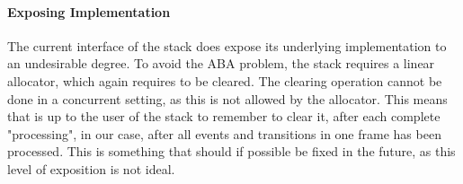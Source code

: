 \paragraph{Exposing Implementation}
The current interface of the stack does expose its underlying implementation to an
undesirable degree.
To avoid the ABA problem, the stack requires a linear allocator, which again requires
to be cleared.
The clearing operation cannot be done in a concurrent setting, as this is not allowed by the allocator.
This means that is up to the user of the stack to remember to clear it,
after each complete "processing", in our case, after all events and transitions in one frame
has been processed.
This is something that should if possible be fixed in the future, as this level of exposition is not ideal.
